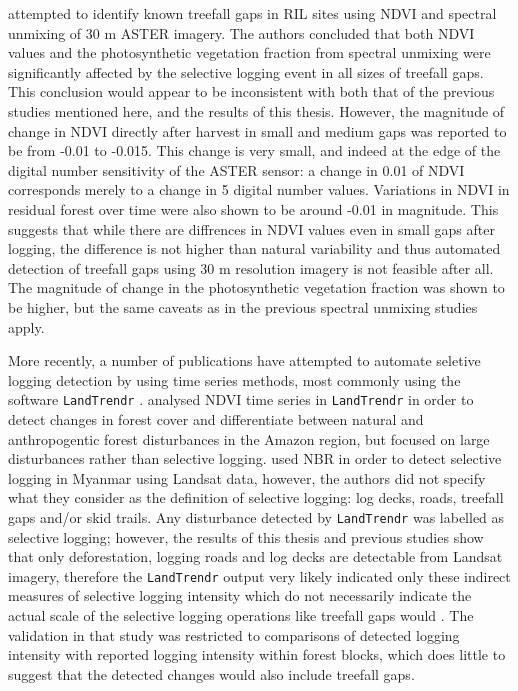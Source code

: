 \documentclass[a4paper,12pt]{scrbook}
\begin{document}
\citet{broadbent_recovery_2006} attempted to identify known treefall gaps in \ac{RIL} sites using \ac{NDVI} and spectral unmixing of 30 m \ac{ASTER} imagery. The authors concluded that both \ac{NDVI} values and the photosynthetic vegetation fraction from spectral unmixing were significantly affected by the selective logging event in all sizes of treefall gaps. This conclusion would appear to be inconsistent with both that of the previous studies mentioned here, and the results of this thesis. However, the magnitude of change in \ac{NDVI} directly after harvest in small and medium gaps was reported to be from -0.01 to -0.015. This change is very small, and indeed at the edge of the digital number sensitivity of the \ac{ASTER} sensor: a change in 0.01 of \ac{NDVI} corresponds merely to a change in 5 digital number values. Variations in \ac{NDVI} in residual forest over time were also shown to be around -0.01 in magnitude. This suggests that while there are diffrences in \ac{NDVI} values even in small gaps after logging, the difference is not higher than natural variability and thus automated detection of treefall gaps using 30 m resolution imagery is not feasible after all. The magnitude of change in the photosynthetic vegetation fraction was shown to be higher, but the same caveats as in the previous spectral unmixing studies apply.

More recently, a number of publications have attempted to automate seletive logging detection by using time series methods, most commonly using the software \texttt{LandTrendr} \citep{kennedy_detecting_2010}. \citet{fragal_reconstructing_2016} analysed \ac{NDVI} time series in \texttt{LandTrendr} in order to detect changes in forest cover and differentiate between natural and anthropogentic forest disturbances in the Amazon region, but focused on large disturbances rather than selective logging. \citet{shimizu_using_2017} used \ac{NBR} in order to detect selective logging in Myanmar using Landsat data, however, the authors did not specify what they consider as the definition of selective logging: log decks, roads, treefall gaps and/or skid trails. Any disturbance detected by \texttt{LandTrendr} was labelled as selective logging; however, the results of this thesis and previous studies show that only deforestation, logging roads and log decks are detectable from Landsat imagery, therefore the \texttt{LandTrendr} output very likely indicated only these indirect measures of selective logging intensity which do not necessarily indicate the actual scale of the selective logging operations like treefall gaps would \citep{frolking_forest_2009}. The validation in that study was restricted to comparisons of detected logging intensity with reported logging intensity within forest blocks, which does little to suggest that the detected changes would also include treefall gaps.
\end{document}
